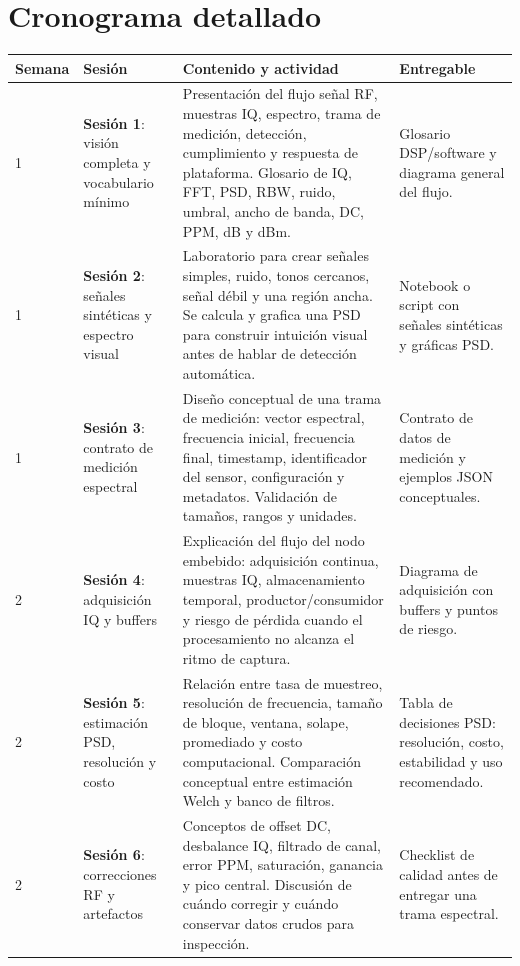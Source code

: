 \documentclass[11pt,a4paper]{article}
\newcommand{\sesion}[1]{\textbf{Sesión #1}}
\begin{document}
\section*{Cronograma detallado}

\begin{longtable}{|p{}|p{}|p{}|p{}|}
\hline
\textbf{Semana} & \textbf{Sesión} & \textbf{Contenido y actividad} & \textbf{Entregable} \\
\hline
\endhead

1 & \sesion{1}: visión completa y vocabulario mínimo &
Presentación del flujo señal RF, muestras IQ, espectro, trama de medición, detección, cumplimiento y respuesta de plataforma. Glosario de IQ, FFT, PSD, RBW, ruido, umbral, ancho de banda, DC, PPM, dB y dBm. &
Glosario DSP/software y diagrama general del flujo. \\
\hline

1 & \sesion{2}: señales sintéticas y espectro visual &
Laboratorio para crear señales simples, ruido, tonos cercanos, señal débil y una región ancha. Se calcula y grafica una PSD para construir intuición visual antes de hablar de detección automática. &
Notebook o script con señales sintéticas y gráficas PSD. \\
\hline

1 & \sesion{3}: contrato de medición espectral &
Diseño conceptual de una trama de medición: vector espectral, frecuencia inicial, frecuencia final, timestamp, identificador del sensor, configuración y metadatos. Validación de tamaños, rangos y unidades. &
Contrato de datos de medición y ejemplos JSON conceptuales. \\
\hline

2 & \sesion{4}: adquisición IQ y buffers &
Explicación del flujo del nodo embebido: adquisición continua, muestras IQ, almacenamiento temporal, productor/consumidor y riesgo de pérdida cuando el procesamiento no alcanza el ritmo de captura. &
Diagrama de adquisición con buffers y puntos de riesgo. \\
\hline

2 & \sesion{5}: estimación PSD, resolución y costo &
Relación entre tasa de muestreo, resolución de frecuencia, tamaño de bloque, ventana, solape, promediado y costo computacional. Comparación conceptual entre estimación Welch y banco de filtros. &
Tabla de decisiones PSD: resolución, costo, estabilidad y uso recomendado. \\
\hline

2 & \sesion{6}: correcciones RF y artefactos &
Conceptos de offset DC, desbalance IQ, filtrado de canal, error PPM, saturación, ganancia y pico central. Discusión de cuándo corregir y cuándo conservar datos crudos para inspección. &
Checklist de calidad antes de entregar una trama espectral. \\
\hline


\end{longtable}
\end{document}
